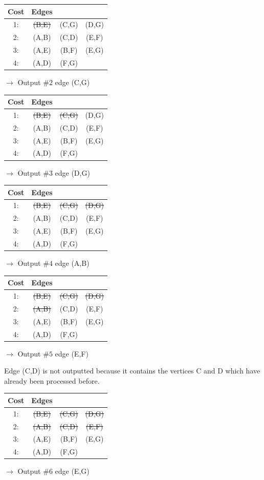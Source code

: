 \documentclass[12pt]{exam}
\begin{document}
\begin{questions}
\begin{parts}
\begin{tabular}{|c|c|c|c|}
\hline
Cost & Edges & & \\
\hline
1: & \st{(B,E)} & (C,G) & (D,G) \\
2: & (A,B) & (C,D) & (E,F) \\ 
3: & (A,E) & (B,F) & (E,G) \\ 
4: & (A,D) & (F,G) & \\
\hline
\end{tabular}
$\rightarrow$ Output $\#2$ edge (C,G)

\begin{tabular}{|c|c|c|c|}
\hline
Cost & Edges & & \\
\hline
1: & \st{(B,E)} & \st{(C,G)} & (D,G) \\
2: & (A,B) & (C,D) & (E,F) \\ 
3: & (A,E) & (B,F) & (E,G) \\ 
4: & (A,D) & (F,G) & \\
\hline
\end{tabular}
$\rightarrow$ Output $\#3$ edge (D,G)

\begin{tabular}{|c|c|c|c|}
\hline
Cost & Edges & & \\
\hline
1: & \st{(B,E)} & \st{(C,G)} & \st{(D,G)} \\
2: & (A,B) & (C,D) & (E,F) \\ 
3: & (A,E) & (B,F) & (E,G) \\ 
4: & (A,D) & (F,G) & \\
\hline
\end{tabular}
$\rightarrow$ Output $\#4$ edge (A,B)

\begin{tabular}{|c|c|c|c|}
\hline
Cost & Edges & & \\
\hline
1: & \st{(B,E)} & \st{(C,G)} & \st{(D,G)} \\
2: & \st{(A,B)} & (C,D) & (E,F) \\ 
3: & (A,E) & (B,F) & (E,G) \\ 
4: & (A,D) & (F,G) & \\
\hline
\end{tabular}
$\rightarrow$ Output $\#5$ edge (E,F) 

Edge (C,D) is not outputted because it contains the vertices C and D which have already been processed before.

\begin{tabular}{|c|c|c|c|}
\hline
Cost & Edges & & \\
\hline
1: & \st{(B,E)} & \st{(C,G)} & \st{(D,G)} \\
2: & \st{(A,B)} & \st{(C,D)} & \st{(E,F)} \\ 
3: & (A,E) & (B,F) & (E,G) \\ 
4: & (A,D) & (F,G) & \\
\hline
\end{tabular}
$\rightarrow$ Output $\#6$ edge (E,G)


\end{parts}
\end{questions}
\end{document}
